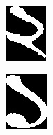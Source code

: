 \documentclass{standalone}
\begin{document}
\begin{figure}
\begin{subfigure}{0.15\textwidth}
  \includegraphics[width=0.8\linewidth]{./img/sample/stage13-4}
\end{subfigure}
\begin{subfigure}{0.15\textwidth}
  \centering
  \includegraphics[width=0.8\linewidth]{./img/sample/stage13-5}

\end{subfigure}
\end{figure}
\end{document}
